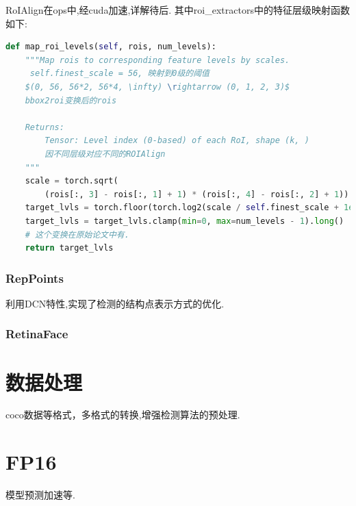 \documentclass[UTF8]{ctexart}
\begin{document}
RoIAlign在ops中,经cuda加速,详解待后.
其中roi\_extractors中的特征层级映射函数如下:
\lstset{style=mystyle}
\begin{lstlisting}[language=Python]
	def map_roi_levels(self, rois, num_levels):
	"""Map rois to corresponding feature levels by scales.
	 self.finest_scale = 56, 映射到0级的阈值
	$(0, 56, 56*2, 56*4, \infty) \rightarrow (0, 1, 2, 3)$
	bbox2roi变换后的rois

	Returns:
		Tensor: Level index (0-based) of each RoI, shape (k, )
		因不同层级对应不同的ROIAlign
	"""
	scale = torch.sqrt(
		(rois[:, 3] - rois[:, 1] + 1) * (rois[:, 4] - rois[:, 2] + 1))
	target_lvls = torch.floor(torch.log2(scale / self.finest_scale + 1e-6))
	target_lvls = target_lvls.clamp(min=0, max=num_levels - 1).long()
	# 这个变换在原始论文中有.
	return target_lvls
\end{lstlisting}

\subsubsection{RepPoints}
	利用DCN特性,实现了检测的结构点表示方式的优化.

\subsubsection{RetinaFace}



\section{数据处理}
\label{sec:detail}
coco数据等格式，多格式的转换,增强检测算法的预处理.


\section{FP16}
模型预测加速等.
\end{document}
